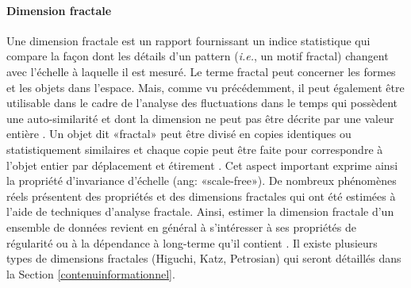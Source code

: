 \paragraph{Dimension fractale\\}
\label{fracdim}

Une dimension fractale est un rapport fournissant un indice statistique qui compare la façon dont les détails d'un pattern (\textit{i.e.}, un motif fractal) changent avec l'échelle à laquelle il est mesuré. 
Le terme fractal peut concerner les formes et les objets dans l'espace. 
Mais, comme vu précédemment, il peut également être utilisable dans le cadre de l'analyse des fluctuations dans le temps qui possèdent une auto-similarité et dont la dimension ne peut pas être décrite par une valeur entière \citep{klonowski2000signal}. 
Un objet dit «fractal» peut être divisé en copies identiques ou statistiquement similaires et chaque copie peut être faite pour correspondre à l'objet entier par déplacement et étirement \citep{goh2005comparison}. 
Cet aspect important exprime ainsi la propriété d'invariance d'échelle (ang: «scale-free»). 
De nombreux phénomènes réels présentent des propriétés et des dimensions fractales qui ont été estimées à l'aide de techniques d'analyse fractale. 
Ainsi, estimer la dimension fractale d’un ensemble de données revient en général à s’intéresser à ses propriétés de régularité ou à la dépendance à long-terme qu'il contient \citep{le1998methode}.
Il existe plusieurs types de dimensions fractales (Higuchi, Katz, Petrosian) qui seront détaillés dans la Section \ref{contenuinformationnel}. 

